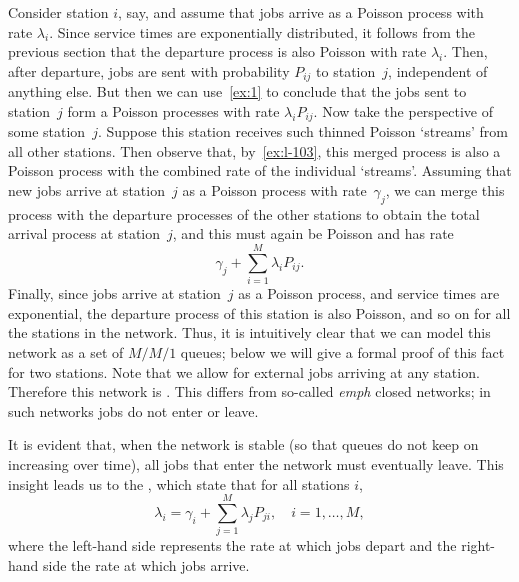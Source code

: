 Consider station $i$, say, and assume that jobs arrive as a Poisson process with rate $\lambda_i$.
Since service times are exponentially distributed, it follows from the previous section that the departure process is also Poisson with rate $\lambda_i$.
Then, after departure, jobs are sent with probability $P_{i j}$ to station~$j$, independent of anything else.
But then we can use~\cref{ex:1} to conclude that the jobs sent to station~$j$ form a Poisson processes with rate $\lambda_i P_{i j}$.
Now take the perspective of some station~$j$.
Suppose this station receives such thinned Poisson `streams' from all other stations.
Then observe that, by~\cref{ex:l-103}, this merged process is also a Poisson process with the combined rate of the individual `streams'.
Assuming that new jobs arrive at station~$j$ as a Poisson process with rate~$\gamma_j$, we can merge this process with the departure processes of the other stations to obtain the total arrival process at station~$j$, and this must again be Poisson and has rate
\begin{equation*}
\gamma_j + \sum_{i=1}^M \lambda_i P_{i j}.
\end{equation*}
Finally, since jobs arrive at station~$j$ as a Poisson process, and service times are exponential, the departure process of this station is also Poisson, and so on for all the stations in the network.
Thus, it is intuitively clear that we can model this network as a set of $M/M/1$ queues; below we will give a formal proof of this fact for two stations.
Note that we allow for external jobs arriving at any station.
Therefore this network is .
This differs from so-called \emph{emph} closed networks; in such networks jobs do not enter or leave.

It is evident that, when the network is stable (so that queues do not keep on increasing over time), all jobs that enter the network must eventually leave.
This insight leads us to the , which state that for all stations $i$, 
\begin{equation}
  \label{eq:101}
  \lambda_i = \gamma_i + \sum_{j=1}^M \lambda_j P_{j i}, \quad i = 1, \ldots, M,
\end{equation}
where the left-hand side represents the rate at which jobs depart and the right-hand side the rate at which jobs arrive. 

